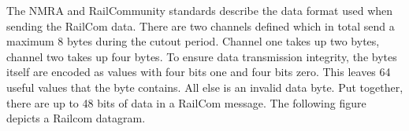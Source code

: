 The NMRA and RailCommunity standards describe the data format used when sending the RailCom data. There are two channels defined which in total send a maximum 8 bytes during the cutout period. Channel one takes up two bytes, channel two takes up four bytes. To ensure data transmission integrity, the bytes itself are encoded as values with four bits one and four bits zero. This leaves 64 useful values that the byte contains. All else is an invalid data byte. Put together, there are up to 48 bits of data in a RailCom message. The following figure depicts a Railcom datagram.

\begin{center}
\end{center}
